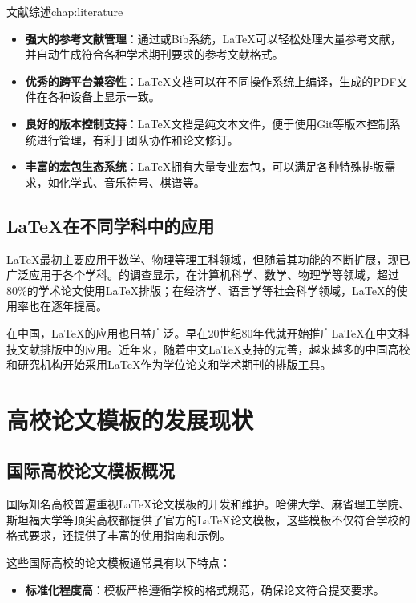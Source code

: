 \begin{cuzchapter}{文献综述}{chap:literature}
\begin{itemize}
		\item \textbf{强大的参考文献管理}：通过或Bib系统，\LaTeX{}可以轻松处理大量参考文献，并自动生成符合各种学术期刊要求的参考文献格式。
		
		\item \textbf{优秀的跨平台兼容性}：\LaTeX{}文档可以在不同操作系统上编译，生成的PDF文件在各种设备上显示一致。
		
		\item \textbf{良好的版本控制支持}：\LaTeX{}文档是纯文本文件，便于使用Git等版本控制系统进行管理，有利于团队协作和论文修订。
		
		\item \textbf{丰富的宏包生态系统}：\LaTeX{}拥有大量专业宏包，可以满足各种特殊排版需求，如化学式、音乐符号、棋谱等。
	\end{itemize}
	
	\subsection{LaTeX在不同学科中的应用}
	
	\LaTeX{}最初主要应用于数学、物理等理工科领域，但随着其功能的不断扩展，现已广泛应用于各个学科。\citet{hls2012jinji}的调查显示，在计算机科学、数学、物理学等领域，超过80\%的学术论文使用\LaTeX{}排版；在经济学、语言学等社会科学领域，\LaTeX{}的使用率也在逐年提高。
	
	在中国，\LaTeX{}的应用也日益广泛。\citet{chen1980zhongguo}早在20世纪80年代就开始推广\LaTeX{}在中文科技文献排版中的应用。近年来，随着中文\LaTeX{}支持的完善，越来越多的中国高校和研究机构开始采用\LaTeX{}作为学位论文和学术期刊的排版工具。
	
	\section{高校论文模板的发展现状}\label{sec:template-status}
	
	\subsection{国际高校论文模板概况}
	
	国际知名高校普遍重视\LaTeX{}论文模板的开发和维护。哈佛大学、麻省理工学院、斯坦福大学等顶尖高校都提供了官方的\LaTeX{}论文模板，这些模板不仅符合学校的格式要求，还提供了丰富的使用指南和示例。
	
	这些国际高校的论文模板通常具有以下特点：
	
	\begin{itemize}
		\item \textbf{标准化程度高}：模板严格遵循学校的格式规范，确保论文符合提交要求。
		

\end{itemize}
\end{cuzchapter}

